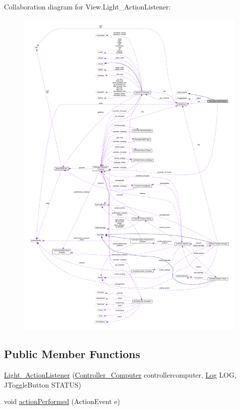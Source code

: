 Collaboration diagram for View.\+Light\+\_\+\+Action\+Listener\+:
\nopagebreak
\begin{figure}[H]
\begin{center}
\leavevmode
\includegraphics[width=350pt]{class_view_1_1_light___action_listener__coll__graph}
\end{center}
\end{figure}
\subsection*{Public Member Functions}
\begin{DoxyCompactItemize}
\item 
\hyperlink{class_view_1_1_light___action_listener_a7cd5c5d4fd823bdadf4f2b472a3279b9}{Light\+\_\+\+Action\+Listener} (\hyperlink{class_controller_1_1_controller___computer}{Controller\+\_\+\+Computer} controllercomputer, \hyperlink{class_model_1_1_log}{Log} L\+O\+G, J\+Toggle\+Button S\+T\+A\+T\+U\+S)
\item 
void \hyperlink{class_view_1_1_light___action_listener_a8f75ad437e0e060b38f426865ae98162}{action\+Performed} (Action\+Event e)
\end{DoxyCompactItemize}


